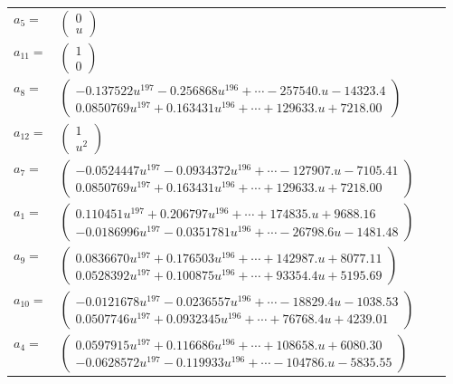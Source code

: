 \documentclass[1p]{elsarticle_modified}
\theoremstyle{definition}
\begin{document}
\begin{tabular}{m{7pt} m{180pt} m{7pt} m{180pt} }
\flushright $a_{5}=$&$\begin{pmatrix}0\\u\end{pmatrix}$ \\
\flushright $a_{11}=$&$\begin{pmatrix}1\\0\end{pmatrix}$ \\
\flushright $a_{8}=$&$\begin{pmatrix}-0.137522 u^{197}-0.256868 u^{196}+\cdots-257540. u-14323.4\\0.0850769 u^{197}+0.163431 u^{196}+\cdots+129633. u+7218.00\end{pmatrix}$ \\
\flushright $a_{12}=$&$\begin{pmatrix}1\\u^2\end{pmatrix}$ \\
\flushright $a_{7}=$&$\begin{pmatrix}-0.0524447 u^{197}-0.0934372 u^{196}+\cdots-127907. u-7105.41\\0.0850769 u^{197}+0.163431 u^{196}+\cdots+129633. u+7218.00\end{pmatrix}$ \\
\flushright $a_{1}=$&$\begin{pmatrix}0.110451 u^{197}+0.206797 u^{196}+\cdots+174835. u+9688.16\\-0.0186996 u^{197}-0.0351781 u^{196}+\cdots-26798.6 u-1481.48\end{pmatrix}$ \\
\flushright $a_{9}=$&$\begin{pmatrix}0.0836670 u^{197}+0.176503 u^{196}+\cdots+142987. u+8077.11\\0.0528392 u^{197}+0.100875 u^{196}+\cdots+93354.4 u+5195.69\end{pmatrix}$ \\
\flushright $a_{10}=$&$\begin{pmatrix}-0.0121678 u^{197}-0.0236557 u^{196}+\cdots-18829.4 u-1038.53\\0.0507746 u^{197}+0.0932345 u^{196}+\cdots+76768.4 u+4239.01\end{pmatrix}$ \\
\flushright $a_{4}=$&$\begin{pmatrix}0.0597915 u^{197}+0.116686 u^{196}+\cdots+108658. u+6080.30\\-0.0628572 u^{197}-0.119933 u^{196}+\cdots-104786. u-5835.55\end{pmatrix}$ \\

\end{tabular}
\end{document}
